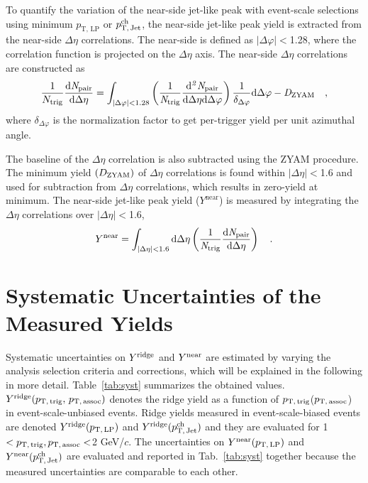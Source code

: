 To quantify the variation of the near-side jet-like peak with event-scale selections using minimum $p_\mathrm{T,\,LP}$ or $p_\mathrm{T,\,Jet}^\mathrm{ch}$, the near-side jet-like peak yield is extracted from the near-side $\Delta\eta$ correlations. The near-side is defined as $|\Delta\varphi|<$1.28, where the correlation function is projected on the $\Delta\eta$ axis. The near-side $\Delta\eta$ correlations are constructed as
\begin{eqnarray}
\frac{1}{N_{\rm{trig}}} \frac{ \rm{d}\it{}N_{\rm{pair}} }{ \rm{d}\Delta\eta } = \int_{|\Delta \varphi|<1.28} \left( \frac{1}{\it{N}_{\rm{trig}}} \frac{ \rm{d}\it{}^{2} N_{\rm{pair}} }{ \rm{d}\Delta\eta d\Delta\varphi} \right) \dfrac{1}{\delta_{\Delta\varphi}} \rm{d} \Delta \varphi - \it{D}_{\rm{ZYAM}} \quad,
\end{eqnarray}
where $\delta_{\Delta\varphi}$ is the normalization factor to get per-trigger yield per unit azimuthal angle.

The baseline of the $\Delta\eta$ correlation is also subtracted using the ZYAM procedure. The minimum yield $(D_{\rm{ZYAM}})$ of $\Delta\eta$ correlations is found within $|\Delta\eta|<$1.6 and used for subtraction from  $\Delta\eta$ correlations, which results in zero-yield at minimum. The near-side jet-like peak yield ($Y^{\mathrm{near}}$) is measured by integrating the $\Delta\eta$ correlations over $|\Delta\eta|<$1.6,
\begin{eqnarray}
Y^{\rm{near}} = \int_{|\Delta \eta|<1.6} \rm{d} \Delta\eta \left( \frac{1}{\it{N}_{\rm{trig}}} \frac{ \rm{d}\it{}N_{\rm{pair}} }{ \rm{d}\Delta\eta } \right)\quad.
\end{eqnarray}



\section{Systematic Uncertainties of the Measured Yields}
\label{sec:uncertainties}

Systematic uncertainties on $Y^{\rm{ridge}}$ and $Y^{\rm{near}}$ are estimated by varying the analysis selection criteria and corrections, which will be explained in the following in more detail. Table~\ref{tab:syst} summarizes the obtained values. $Y^{\rm{ridge}}(p_\mathrm{T,\,trig},\,p_\mathrm{T,\,assoc})$ denotes the ridge yield as a function of $p_\mathrm{T,\,trig}$($p_\mathrm{T,\,assoc}$) in event-scale-unbiased events. Ridge yields measured in event-scale-biased events are denoted $Y^{\rm{ridge}}(p_\mathrm{T,\,LP})$ and $Y^{\rm{ridge}}(p_\mathrm{T,\,Jet}^\mathrm{ch})$ and they are evaluated for 1$<p_\mathrm{T,\,trig}, p_\mathrm{T,\,assoc}<$2 GeV/$c$. The uncertainties on $Y^{\rm{near}}(p_\mathrm{T,\,LP})$ and $Y^{\rm{near}}(p_\mathrm{T,\,Jet}^\mathrm{ch})$ are evaluated and reported in Tab.~\ref{tab:syst} together because the measured uncertainties are comparable to each other.

